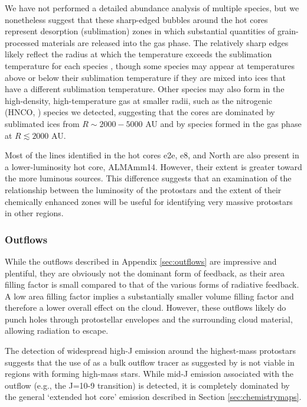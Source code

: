 \documentclass[twocolumn]{aastex61}
\begin{document}
We have not performed a detailed abundance analysis of multiple species, but we
nonetheless suggest that these sharp-edged bubbles around the hot cores
represent desorption (sublimation) zones in which substantial quantities of
grain-processed materials are released into the gas phase.  The relatively
sharp edges likely reflect the radius at which the temperature exceeds
the sublimation temperature for each species \citep{Garrod2006a,Green2009a},
though some species may appear at temperatures above or below their sublimation
temperature if they are mixed into ices that have a different sublimation
temperature.  Other species may also form in the high-density, high-temperature
gas at smaller radii, such as the nitrogenic (HNCO, \formamide) species we
detected, suggesting that the cores are dominated by sublimated ices from
$R\sim2000-5000$ AU and by species formed in the gas phase at $R\lesssim2000$
AU.

Most of the lines identified in the hot cores e2e, e8, and North are also
present in a lower-luminosity hot core, ALMAmm14.  However, their extent is
greater toward the more luminous sources.  This difference suggests that an
examination of the relationship between the luminosity of the protostars and
the extent of their chemically enhanced zones will be useful for identifying
 very massive protostars in other regions.


\subsubsection{Outflows}
\label{sec:outflowdiscussion}
While the outflows described in Appendix \ref{sec:outflows} are impressive and
plentiful, they are obviously not the dominant form of feedback, as their area
filling factor is small compared to that of the various forms of radiative
feedback.  A low area filling factor implies a substantially smaller volume
filling factor and therefore a lower overall effect on the cloud.  However,
these outflows likely do punch holes through protostellar envelopes and the
surrounding cloud material, allowing radiation to escape.

The detection of widespread high-J \methanol emission around the highest-mass
protostars suggests that the use of \methanol as a bulk outflow tracer as
suggested by \citet{Kristensen2015a} is not viable in regions with forming
high-mass stars.  While mid-J \methanol emission associated with
the outflow (e.g., the J=10-9 transition) is detected, it is completely
dominated by the general `extended hot core' emission described in Section
\ref{sec:chemistrymaps}.
\end{document}
